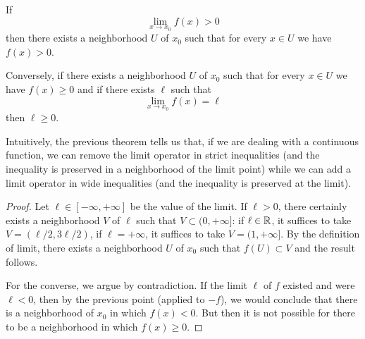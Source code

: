 \begin{theorem}%
  \label{th:permanenza_segno}%
\mymark{***}%
%
%
%
If
\[
  \lim_{x\to x_0} f(x) > 0
\]
then there exists a neighborhood $U$ of $x_0$ such that 
for every $x\in U$ we have $f(x) > 0$.

Conversely, if there exists a neighborhood $U$ of $x_0$ such that for every $x
\in U$
we have $f(x)\ge 0$ and if there exists $\ell$ such that 
\[
    \lim_{x\to x_0} f(x) = \ell
\]
then $\ell\ge 0$.
\end{theorem}
%
Intuitively, the previous theorem tells us that, 
if we are dealing with a continuous function,
we can remove the limit operator in strict inequalities 
(and the inequality is preserved in a neighborhood of the limit point)
while we can add a limit operator in wide inequalities
(and the inequality is preserved at the limit).
%
\begin{proof}
Let $\ell\in [-\infty,+\infty]$ be the value of the limit.
If $\ell>0$, there certainly exists a neighborhood $V$ of $\ell$ 
such that $V\subset (0,+\infty]$: if $\ell\in {\mathbb R}$, it suffices to take 
$V=(\ell/2,3 \ell/2)$, if $\ell=+\infty$, it suffices to take $V=(1,+\infty]$.
By the definition of limit, there exists a neighborhood $U$ of $x_0$ 
such that $f(U)\subset V$ and the result follows.

For the converse, we argue by contradiction. 
If the limit $\ell$ of $f$ existed and were $\ell < 0$,
then by the previous point (applied to $-f$), we would 
conclude that there is a neighborhood of $x_0$ in which $f(x)<0$.
But then it is not possible for there to be a neighborhood in which $f(x)\ge 0$.
\end{proof}

